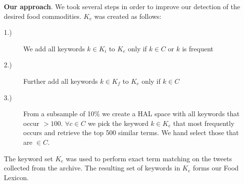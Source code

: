 \documentclass[12pt]{report}
\begin{document}
\textbf{Our approach}. We took several  steps in order to improve our detection of the desired food commodities. $K_e$ was created as follows: 
\begin{description}
  \item[1.)] We add all keywords $k \in K_i$ to  $K_e$ only if $k \in C $ or $k$ is frequent 
  \item[2.)] Further add all keywords $ k \in K_f$ to $K_e$ only if $k \in C$
  \item[3.)] From a subsample of 10\% we create a HAL space with all keywords that occur $> 100$. $\forall c \in C $ we pick the keyword $k\in K_e$ that most frequently occurs and retrieve the top 500 similar terms. We hand select those that are $\in C$.
\end{description}

 
The keyword set $K_e$ was used to perform exact term matching on the tweets collected from the archive. The resulting set of keywords in $K_e$ forms our Food Lexicon.  
\end{document}
